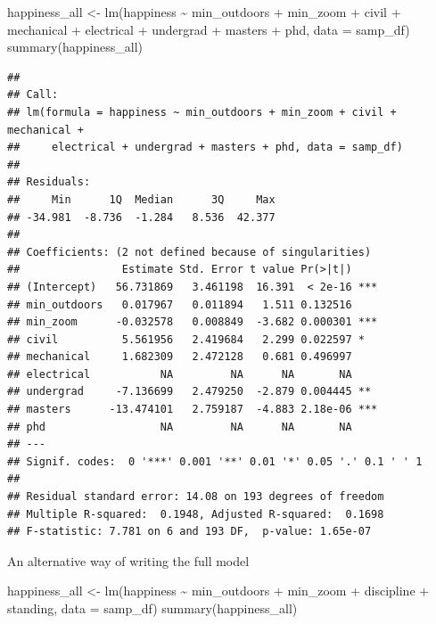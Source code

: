 \documentclass[
]{book}
\newenvironment{Shaded}{\begin{snugshade}}{\end{snugshade}}
\newcommand{\AttributeTok}[1]{\textcolor[rgb]{0.77,0.63,0.00}{#1}}
\newcommand{\FunctionTok}[1]{\textcolor[rgb]{0.00,0.00,0.00}{#1}}
\newcommand{\NormalTok}[1]{#1}
\newcommand{\OtherTok}[1]{\textcolor[rgb]{0.56,0.35,0.01}{#1}}
\newcommand{\SpecialCharTok}[1]{\textcolor[rgb]{0.00,0.00,0.00}{#1}}
\begin{document}
\begin{Shaded}
\begin{Highlighting}[]
\NormalTok{happiness\_all }\OtherTok{\textless{}{-}} \FunctionTok{lm}\NormalTok{(happiness }\SpecialCharTok{\textasciitilde{}}\NormalTok{ min\_outdoors }\SpecialCharTok{+}\NormalTok{ min\_zoom }\SpecialCharTok{+}\NormalTok{ civil }\SpecialCharTok{+}\NormalTok{ mechanical }\SpecialCharTok{+}\NormalTok{ electrical }\SpecialCharTok{+}\NormalTok{ undergrad }\SpecialCharTok{+}\NormalTok{ masters }\SpecialCharTok{+}\NormalTok{ phd, }\AttributeTok{data =}\NormalTok{ samp\_df)}
\FunctionTok{summary}\NormalTok{(happiness\_all)}
\end{Highlighting}
\end{Shaded}

\begin{verbatim}
## 
## Call:
## lm(formula = happiness ~ min_outdoors + min_zoom + civil + mechanical + 
##     electrical + undergrad + masters + phd, data = samp_df)
## 
## Residuals:
##     Min      1Q  Median      3Q     Max 
## -34.981  -8.736  -1.284   8.536  42.377 
## 
## Coefficients: (2 not defined because of singularities)
##                Estimate Std. Error t value Pr(>|t|)    
## (Intercept)   56.731869   3.461198  16.391  < 2e-16 ***
## min_outdoors   0.017967   0.011894   1.511 0.132516    
## min_zoom      -0.032578   0.008849  -3.682 0.000301 ***
## civil          5.561956   2.419684   2.299 0.022597 *  
## mechanical     1.682309   2.472128   0.681 0.496997    
## electrical           NA         NA      NA       NA    
## undergrad     -7.136699   2.479250  -2.879 0.004445 ** 
## masters      -13.474101   2.759187  -4.883 2.18e-06 ***
## phd                  NA         NA      NA       NA    
## ---
## Signif. codes:  0 '***' 0.001 '**' 0.01 '*' 0.05 '.' 0.1 ' ' 1
## 
## Residual standard error: 14.08 on 193 degrees of freedom
## Multiple R-squared:  0.1948, Adjusted R-squared:  0.1698 
## F-statistic: 7.781 on 6 and 193 DF,  p-value: 1.65e-07
\end{verbatim}

An alternative way of writing the full model

\begin{Shaded}
\begin{Highlighting}[]
\NormalTok{happiness\_all }\OtherTok{\textless{}{-}} \FunctionTok{lm}\NormalTok{(happiness }\SpecialCharTok{\textasciitilde{}}\NormalTok{ min\_outdoors }\SpecialCharTok{+}\NormalTok{ min\_zoom }\SpecialCharTok{+}\NormalTok{ discipline }\SpecialCharTok{+}\NormalTok{ standing, }\AttributeTok{data =}\NormalTok{ samp\_df)}
\FunctionTok{summary}\NormalTok{(happiness\_all)}
\end{Highlighting}
\end{Shaded}
\end{document}
